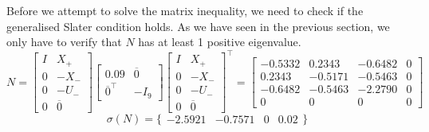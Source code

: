 Before we attempt to solve the matrix inequality, we need to check if the generalised Slater condition holds. As we have seen in the previous section, we only have to verify that $N$ has at least 1 positive eigenvalue.
\begin{equation*}
 N = 
 \begin{bmatrix} I&X_+ \\ 0 & -X_- \\ 0&-U_-\\0&\overline{0} \end{bmatrix}
 \begin{bmatrix} 0.09 & \overline{0} \\ \overline{0}^\top & -I_9 \end{bmatrix}
 \begin{bmatrix} I&X_+ \\ 0 & -X_- \\ 0&-U_-\\0&\overline{0} \end{bmatrix}^\top 
 =
 \begin{bmatrix} 
 -0.5332 &  0.2343 & -0.6482 &  0\\
 0.2343 & -0.5171 & -0.5463 &  0\\
 -0.6482 & -0.5463 & -2.2790 &  0\\
 0      &  0      &  0      &  0
 \end{bmatrix} 
\end{equation*}
\begin{equation*}
 \sigma(N) = \{ \begin{array}{cccc}
 -2.5921 & -0.7571 & 0 & 0.02
 \end{array} \}
\end{equation*}

